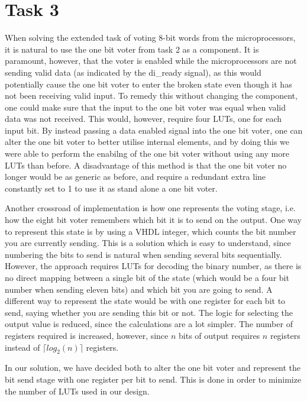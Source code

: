 \documentclass[11pt]{article}
\begin{document}
\section{Task 3}
\label{sec:task3}

When solving the extended task of voting 8-bit words from the
microprocessors, it is natural to use the one bit voter from task 2 as
a component. It is paramount, however, that the voter is enabled while
the microprocessors are not sending valid data (as indicated by the
di\_ready signal), as this would potentially cause the one bit voter
to enter the broken state even though it has not been receiving valid
input. To remedy this without changing the component, one could make
sure that the input to the one bit voter was equal when valid data was
not received. This would, however, require four LUTs, one for each
input bit. By instead passing a data enabled signal into the one bit
voter, one can alter the one bit voter to better utilise internal
elements, and by doing this we were able to perform the enabilng of
the one bit voter without using any more LUTs than before. A
disadvantage of this method is that the one bit voter no longer would
be as generic as before, and require a redundant extra line constantly
set to 1 to use it as stand alone a one bit voter.

Another crossroad of implementation is how one represents the voting
stage, i.e. how the eight bit voter remembers which bit it is to send
on the output. One way to represent this state is by using a VHDL
integer, which counts the bit number you are currently sending. This
is a solution which is easy to understand, since numbering the bits to
send is natural when sending several bits sequentially. However, the
approach requires LUTs for decoding the binary number, as there is no
direct mapping between a single bit of the state (which would be a
four bit number when sending eleven bits) and which bit you are going
to send. A different way to represent the state would be with one
register for each bit to send, saying whether you are sending this bit
or not. The logic for selecting the output value is reduced, since the
calculations are a lot simpler. The number of registers required is
increased, however, since $n$ bits of output requires $n$ registers
instead of $\lceil log_2(n) \rceil$ registers.

In our solution, we have decided both to alter the one bit voter and
represent the bit send stage with one register per bit to send. This
is done in order to minimize the number of LUTs used in our design. 
\end{document}
